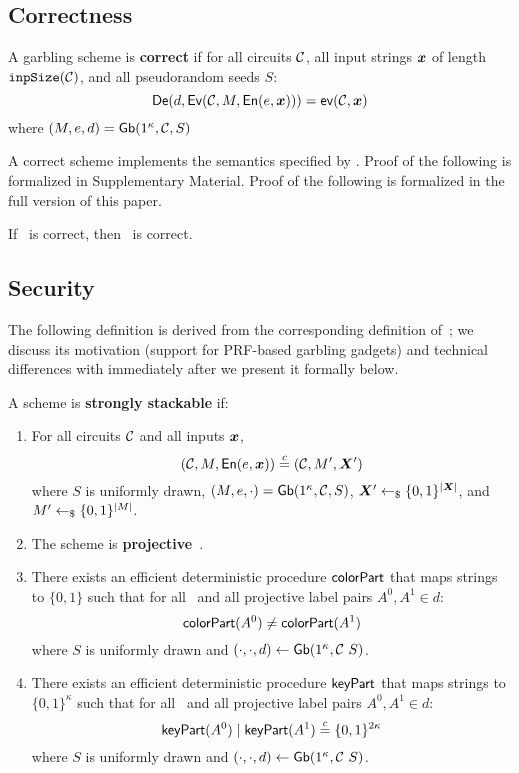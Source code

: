 \subsection{Correctness}\label{sec:correctness}

\begin{definition}[Correctness]\label{def:correct}
  A garbling scheme is \textbf{correct} if for
  all circuits $\mathcal C$,
  all input strings $\cirinp$ of length $\mathtt{inpSize}(\mathcal C)$,
  and all pseudorandom seeds $S$:
  \[
    \gDe(d, \gEv(\cir, \mat,\gEn(e,\cirinp))) = \gev(\cir,\cirinp)
  \]
  where $(M, e, d) = \textsf{Gb}(1^\kappa,\mathcal C,S)$
\end{definition}

A correct scheme implements the semantics specified by \gev.
\iffull
Proof of the following is formalized in Supplementary Material.
\else
Proof of the following is formalized in the full version of
this paper.
\fi

\begin{theorem}\label{theorem:correctness}
  If \underscheme\ is correct, then \ourschemelong\ is correct.
\end{theorem}

\subsection{Security}

The following definition is derived from the corresponding definition
of~\HK; we discuss its motivation (support for PRF-based garbling
gadgets) and technical differences with \HK immediately after we
present it formally below.

\begin{definition}\label{def:stackable}
  A scheme is \textbf{strongly stackable} if:
  \begin{enumerate}
    \item
      For
      all circuits $\mathcal C$
      and all inputs $\cirinp$,
      \[
        (\cir, \mat, \gEn(e, \cirinp)) \indist (\cir, \mat', \gcirinp')
      \]
      where
      $S$ is uniformly drawn,
      $(M, e, \cdot) = \textsf{Gb}(1^\kappa, \mathcal C, S)$,
      $\gcirinp' \drawnfrom{} \{0, 1\}^{|\gcirinp|}$,
      and $M' \gets_{\$} \{0, 1\}^{|M|}$.
    \item
      The scheme is \textbf{projective}~\cite{CCS:BelHoaRog12}.
    \item
      There exists an efficient deterministic procedure $\textsf{colorPart}$ that
      maps strings to $\{0, 1\}$ such that for all \cir\ and all
      projective label pairs $A^0, A^1 \in d$:
      \[
        \textsf{colorPart}(A^0) \neq \textsf{colorPart}(A^1)
      \]
      where $S$ is uniformly drawn and $(\cdot, \cdot, d) \gets \textsf{Gb}(1^\kappa, \mathcal C\ S)$.
    \item
      There exists an efficient deterministic procedure $\textsf{keyPart}$ that
      maps strings to $\{0, 1\}^\kappa$ such that for all \cir\ and all
      projective label pairs $A^0, A^1 \in d$:
      \[
        \textsf{keyPart}(A^0) \mid \textsf{keyPart}(A^1) \overset{c}{=} \{0, 1\}^{2\kappa}
      \]
      where $S$ is uniformly drawn and $(\cdot, \cdot, d) \gets \textsf{Gb}(1^\kappa, \mathcal C\ S)$.
  \end{enumerate}
\end{definition}

